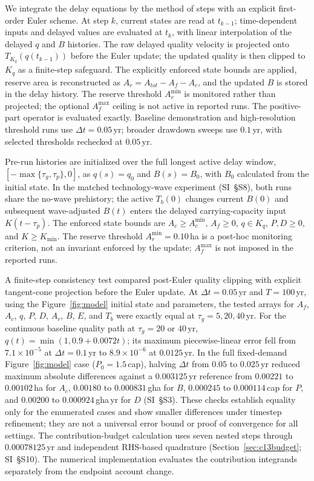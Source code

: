\documentclass[preprint,12pt,authoryear]{elsarticle}
\newcommand{\Acmin}{A_c^{\min}}
\begin{document}
We integrate the delay equations by the method of steps with an explicit first-order Euler scheme. At step $k$, current states are read at $t_{k-1}$; time-dependent inputs and delayed values are evaluated at $t_k$, with linear interpolation of the delayed $q$ and $B$ histories. The raw delayed quality velocity is projected onto $T_{K_q}(q(t_{k-1}))$ before the Euler update; the updated quality is then clipped to $K_q$ as a finite-step safeguard. The explicitly enforced state bounds are applied, reserve area is reconstructed as $A_r=A_{tot}-A_f-A_c$, and the updated $B$ is stored in the delay history. The reserve threshold $A_r^{\min}$ is monitored rather than projected; the optional $A_f^{\max}$ ceiling is not active in reported runs. The positive-part operator is evaluated exactly. Baseline demonstration and high-resolution threshold runs use $\Delta t=0.05$\,yr; broader drawdown sweeps use $0.1$\,yr, with selected thresholds rechecked at $0.05$\,yr.

Pre-run histories are initialized over the full longest active delay window, $[-\max\{\tau_g,\tau_p\},0]$, as $q(s)=q_0$ and $B(s)=B_0$, with $B_0$ calculated from the initial state. In the matched technology-wave experiment (SI~\S S8), both runs share the no-wave prehistory; the active $T_b(0)$ changes current $B(0)$ and subsequent wave-adjusted $B(t)$ enters the delayed carrying-capacity input $K(t-\tau_p)$. The enforced state bounds are $A_c\ge\Acmin$, $A_f\ge0$, $q\in K_q$, $P,D\ge0$, and $K\ge K_{\min}$. The reserve threshold $A_r^{\min}=0.10$\,ha is a post-hoc monitoring criterion, not an invariant enforced by the update; $A_f^{\max}$ is not imposed in the reported runs.

A finite-step consistency test compared post-Euler quality clipping with explicit tangent-cone projection before the Euler update. At $\Delta t=0.05$\,yr and $T=100$\,yr, using the Figure~\ref{fig:model} initial state and parameters, the tested arrays for $A_f$, $A_c$, $q$, $P$, $D$, $A_r$, $B$, $E$, and $T_b$ were exactly equal at $\tau_g=5,20,40$\,yr. For the continuous baseline quality path at $\tau_g=20$ or $40$\,yr, $q(t)=\min(1,0.9+0.0072t)$; its maximum piecewise-linear error fell from $7.1\times10^{-5}$ at $\Delta t=0.1$\,yr to $8.9\times10^{-6}$ at $0.0125$\,yr. In the full fixed-demand Figure~\ref{fig:model} case ($P_0=1.5$\,cap), halving $\Delta t$ from $0.05$ to $0.025$\,yr reduced maximum absolute differences against a $0.003125$\,yr reference from $0.00221$ to $0.00102$\,ha for $A_c$, $0.00180$ to $0.000831$\,gha for $B$, $0.000245$ to $0.000114$\,cap for $P$, and $0.00200$ to $0.000924$\,gha\,yr for $D$ (SI~\S S3). These checks establish equality only for the enumerated cases and show smaller differences under timestep refinement; they are not a universal error bound or proof of convergence for all settings. The contribution-budget calculation uses seven nested steps through $0.00078125$\,yr and independent RHS-based quadrature (Section~\ref{sec:c13budget}; SI~\S S10). The numerical implementation evaluates the contribution integrands separately from the endpoint account change.
\end{document}
